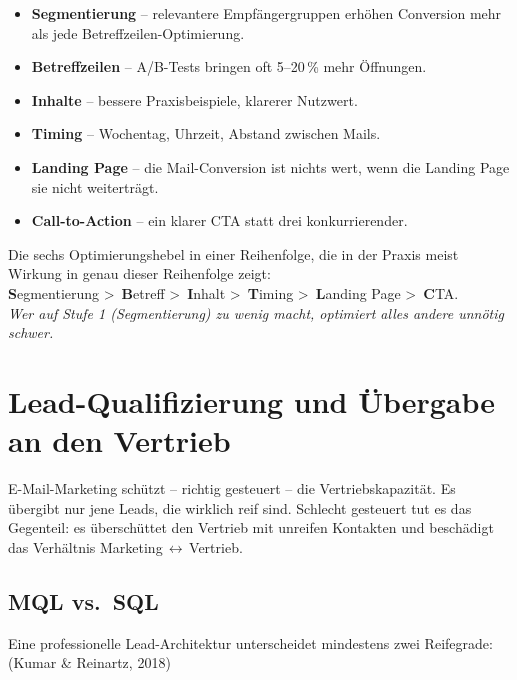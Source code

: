 \documentclass[11pt,a4paper,oneside]{article}
\newcommand{\caveatfontfallback}{\itshape}
\newcommand\caveatfont{\caveatfontfallback}%
\newcommand{\akzent}[1]{{\caveatfont\color{lpAmber}#1}}
\newcommand{\quelle}[1]{{\footnotesize\color{lpGray}(#1)}}
\begin{document}
\begin{itemize}
  \item \textbf{Segmentierung} -- relevantere Empfängergruppen erhöhen Conversion mehr als jede Betreffzeilen-Optimierung.
  \item \textbf{Betreffzeilen} -- A/B-Tests bringen oft 5--20\,\% mehr Öffnungen.
  \item \textbf{Inhalte} -- bessere Praxisbeispiele, klarerer Nutzwert.
  \item \textbf{Timing} -- Wochentag, Uhrzeit, Abstand zwischen Mails.
  \item \textbf{Landing Page} -- die Mail-Conversion ist nichts wert, wenn die Landing Page sie nicht weiterträgt.
  \item \textbf{Call-to-Action} -- ein klarer CTA statt drei konkurrierender.
\end{itemize}

\begin{eselsbox}[Eselsbrücke: \akzent{S-B-I-T-L-C}]
Die sechs Optimierungshebel in einer Reihenfolge, die in der Praxis meist Wirkung in genau dieser Reihenfolge zeigt:\\[2pt]
\textbf{S}egmentierung \textgreater\ \textbf{B}etreff \textgreater\ \textbf{I}nhalt \textgreater\ \textbf{T}iming \textgreater\ \textbf{L}anding Page \textgreater\ \textbf{C}TA.\\[2pt]
\emph{Wer auf Stufe 1 (Segmentierung) zu wenig macht, optimiert alles andere unnötig schwer.}
\end{eselsbox}

\section{Lead-Qualifizierung und Übergabe an den Vertrieb}

E-Mail-Marketing schützt -- richtig gesteuert -- die Vertriebskapazität. Es übergibt nur jene Leads, die wirklich reif sind. Schlecht gesteuert tut es das Gegenteil: es überschüttet den Vertrieb mit unreifen Kontakten und beschädigt das Verhältnis Marketing\,$\leftrightarrow$\,Vertrieb.

\subsection{MQL vs.\ SQL}

Eine professionelle Lead-Architektur unterscheidet mindestens zwei Reifegrade: \quelle{Kumar \& Reinartz, 2018}
\end{document}
